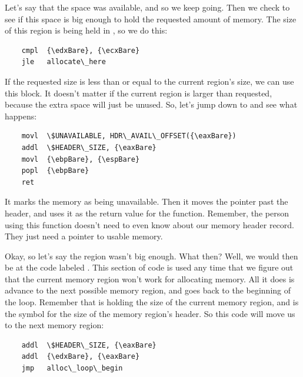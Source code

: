 Let's say that the space was available, and so we keep going.  Then we check to
see if this space is big enough to hold the requested amount of memory.  The size of
this region is being held in {\edxReg}, so we do this:

\begin{simpletyping}
\begin{lstlisting}
	cmpl  {\edxBare}, {\ecxBare}
	jle   allocate\_here
\end{lstlisting}
\end{simpletyping}

If the requested size is less than or equal to the current region's size, we
can use this block.  It doesn't matter if the current region is larger than requested,
because the extra space will just be unused.  So, let's jump down to 
 and see what happens:

\begin{simpletyping}
\begin{lstlisting}
	movl  \$UNAVAILABLE, HDR\_AVAIL\_OFFSET({\eaxBare})
	addl  \$HEADER\_SIZE, {\eaxBare}
	movl  {\ebpBare}, {\espBare}
	popl  {\ebpBare}
	ret
\end{lstlisting}
\end{simpletyping}

It marks the memory as being unavailable.  Then it moves the pointer {\eaxReg} past the header,
and uses it as the return value for the function.  Remember, the person using this
function doesn't need to even know about our memory header record.  They just need
a pointer to usable memory. 

Okay, so let's say the region wasn't big enough.  What then?  Well, we would then
be at the code labeled .  This section of code
is used any time that we figure out that
the current memory region won't work for allocating memory.  All it does is
advance {\eaxReg} to the next possible memory region, and goes back
to the beginning of the loop.   Remember that {\edxReg} is holding
the size of the current memory region, and  is the symbol
for the size of the memory region's header.  So this code will move us to the next
memory region:

\begin{simpletyping}
\begin{lstlisting}
	addl  \$HEADER\_SIZE, {\eaxBare}
	addl  {\edxBare}, {\eaxBare}
	jmp   alloc\_loop\_begin
\end{lstlisting}
\end{simpletyping}

